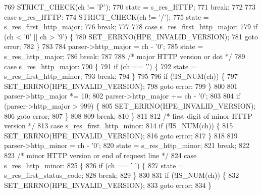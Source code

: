\begin{DoxyCode}
769         STRICT_CHECK(ch != \textcolor{charliteral}{'P'});
770         state = s_res_HTTP;
771         \textcolor{keywordflow}{break};
772 
773       \textcolor{keywordflow}{case} s_res_HTTP:
774         STRICT_CHECK(ch != \textcolor{charliteral}{'/'});
775         state = s_res_first_http_major;
776         \textcolor{keywordflow}{break};
777 
778       \textcolor{keywordflow}{case} s_res_first_http_major:
779         \textcolor{keywordflow}{if} (ch < '0' || ch > \textcolor{charliteral}{'9'}) \{
780           SET_ERRNO(HPE_INVALID_VERSION);
781           \textcolor{keywordflow}{goto} error;
782         \}
783 
784         parser->http_major = ch - \textcolor{charliteral}{'0'};
785         state = s_res_http_major;
786         \textcolor{keywordflow}{break};
787 
788       \textcolor{comment}{/* major HTTP version or dot */}
789       \textcolor{keywordflow}{case} s_res_http_major:
790       \{
791         \textcolor{keywordflow}{if} (ch == \textcolor{charliteral}{'.'}) \{
792           state = s_res_first_http_minor;
793           \textcolor{keywordflow}{break};
794         \}
795 
796         \textcolor{keywordflow}{if} (!IS_NUM(ch)) \{
797           SET_ERRNO(HPE_INVALID_VERSION);
798           \textcolor{keywordflow}{goto} error;
799         \}
800 
801         parser->http_major *= 10;
802         parser->http_major += ch - \textcolor{charliteral}{'0'};
803 
804         \textcolor{keywordflow}{if} (parser->http_major > 999) \{
805           SET_ERRNO(HPE_INVALID_VERSION);
806           \textcolor{keywordflow}{goto} error;
807         \}
808 
809         \textcolor{keywordflow}{break};
810       \}
811 
812       \textcolor{comment}{/* first digit of minor HTTP version */}
813       \textcolor{keywordflow}{case} s_res_first_http_minor:
814         \textcolor{keywordflow}{if} (!IS_NUM(ch)) \{
815           SET_ERRNO(HPE_INVALID_VERSION);
816           \textcolor{keywordflow}{goto} error;
817         \}
818 
819         parser->http_minor = ch - \textcolor{charliteral}{'0'};
820         state = s_res_http_minor;
821         \textcolor{keywordflow}{break};
822 
823       \textcolor{comment}{/* minor HTTP version or end of request line */}
824       \textcolor{keywordflow}{case} s_res_http_minor:
825       \{
826         \textcolor{keywordflow}{if} (ch == \textcolor{charliteral}{' '}) \{
827           state = s_res_first_status_code;
828           \textcolor{keywordflow}{break};
829         \}
830 
831         \textcolor{keywordflow}{if} (!IS_NUM(ch)) \{
832           SET_ERRNO(HPE_INVALID_VERSION);
833           \textcolor{keywordflow}{goto} error;
834         \}

\end{DoxyCode}
